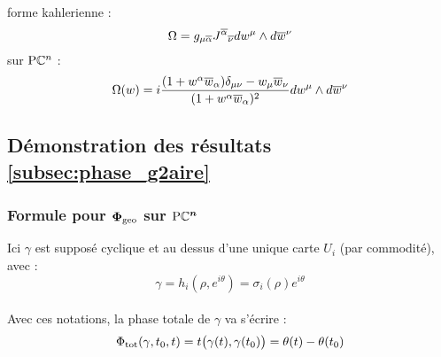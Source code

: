 forme kahlerienne :
\begin{equation}
	\Omega = g_{\mu \overline{\alpha}} {J^{\overline{\alpha}}}_{\overline{\nu}} dw^\mu \wedge d\overline{w}^\nu
\end{equation}
sur $\text{\normalfont P}\mathbb{C}^{n}$ :
\[\Omega(w) = i\frac{(1+w^\alpha \overline{w}_\alpha)\delta_{\mu\nu} - w_\mu \overline{w}_\nu}{(1+w^\alpha \overline{w}_\alpha)^2} dw^\mu \wedge d\overline{w}^\nu\]
\skipl



\subsection{Démonstration des résultats \cref{subsec:phase_g2aire}} \label{ann:stokes}

\subsubsection{Formule pour $\boldsymbol{\Phi_{\text{\normalfont geo}}}$ sur $\boldsymbol{\text{\normalfont P}\mathbb{C}^{n}}$} \label{ann:proj2phaseg}

Ici $\gamma$ est supposé cyclique et au dessus d'une unique carte $U_i$ (par commodité), avec :
\[\gamma = h_i(\rho, e^{i\theta}) = \sigma_i(\rho) e^{i\theta}\]
\\
Avec ces notations, la phase totale de $\gamma$ va s'écrire :
\[\Phi_{\text{\normalfont tot}}(\gamma, t_0, t) = t\big( \gamma(t), \gamma(t_0) \big) = \theta(t) - \theta(t_0)\]
\\

